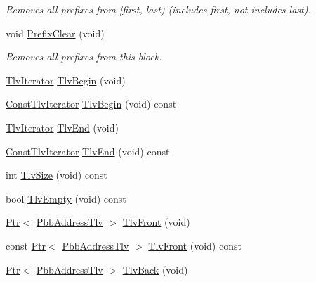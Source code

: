 \begin{DoxyCompactItemize}
\begin{DoxyCompactList}\small\item\em Removes all prefixes from \mbox{[}first, last) (includes first, not includes last). \end{DoxyCompactList}\item 
void \hyperlink{classns3_1_1PbbAddressBlock_a39b32bae97b502dbe5ee9d8b63fa94ab}{Prefix\+Clear} (void)
\begin{DoxyCompactList}\small\item\em Removes all prefixes from this block. \end{DoxyCompactList}\item 
\hyperlink{classns3_1_1PbbAddressBlock_a3bd1d32d5fa278168a97ded673ba0fd3}{Tlv\+Iterator} \hyperlink{classns3_1_1PbbAddressBlock_a6ee3422732a46e14b8b8b2f5a074485a}{Tlv\+Begin} (void)
\item 
\hyperlink{classns3_1_1PbbAddressBlock_aade1f33dd044ed386c19efdaf6036e93}{Const\+Tlv\+Iterator} \hyperlink{classns3_1_1PbbAddressBlock_a0b07a5d19366bfcae55d2f9c828333e5}{Tlv\+Begin} (void) const 
\item 
\hyperlink{classns3_1_1PbbAddressBlock_a3bd1d32d5fa278168a97ded673ba0fd3}{Tlv\+Iterator} \hyperlink{classns3_1_1PbbAddressBlock_a10b09ed12a27cf8dab38c630548fc176}{Tlv\+End} (void)
\item 
\hyperlink{classns3_1_1PbbAddressBlock_aade1f33dd044ed386c19efdaf6036e93}{Const\+Tlv\+Iterator} \hyperlink{classns3_1_1PbbAddressBlock_a38217472f5f6a501a6c869d5bcd54464}{Tlv\+End} (void) const 
\item 
int \hyperlink{classns3_1_1PbbAddressBlock_a322ac192bbda7f0ffe65f29ad3ede869}{Tlv\+Size} (void) const 
\item 
bool \hyperlink{classns3_1_1PbbAddressBlock_a9ab6f2c86cba4ec9aff59a24e989c44b}{Tlv\+Empty} (void) const 
\item 
\hyperlink{classns3_1_1Ptr}{Ptr}$<$ \hyperlink{classns3_1_1PbbAddressTlv}{Pbb\+Address\+Tlv} $>$ \hyperlink{classns3_1_1PbbAddressBlock_a01d512cf0112b604ea5849aa151ba901}{Tlv\+Front} (void)
\item 
const \hyperlink{classns3_1_1Ptr}{Ptr}$<$ \hyperlink{classns3_1_1PbbAddressTlv}{Pbb\+Address\+Tlv} $>$ \hyperlink{classns3_1_1PbbAddressBlock_a629efe3bf6f02e226d5dc3ff28d33c87}{Tlv\+Front} (void) const 
\item 
\hyperlink{classns3_1_1Ptr}{Ptr}$<$ \hyperlink{classns3_1_1PbbAddressTlv}{Pbb\+Address\+Tlv} $>$ \hyperlink{classns3_1_1PbbAddressBlock_a6873eaa5530203d597faf33e1b738037}{Tlv\+Back} (void)
\item 

\end{DoxyCompactItemize}
